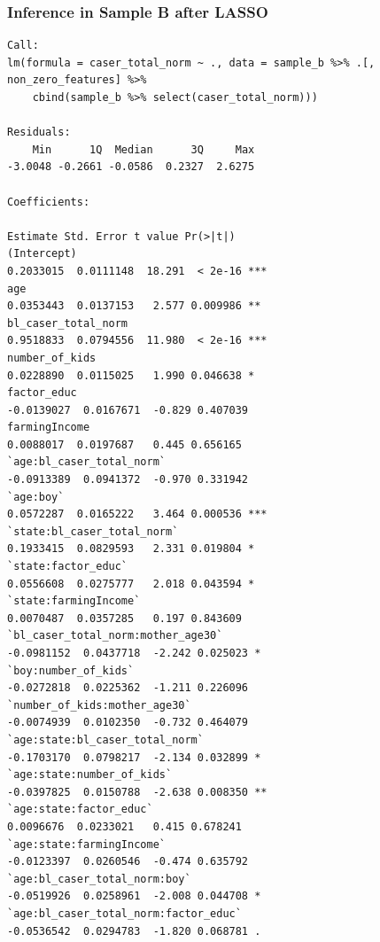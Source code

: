 \documentclass{article}
\begin{document}
\begin{figure}[H]
\subsubsection*{Inference in Sample B after LASSO}
  \begin{lstlisting}[style=RstyleCommentSmall, caption=CATE with Controls selected by LASSO]
Call:
lm(formula = caser_total_norm ~ ., data = sample_b %>% .[, non_zero_features] %>% 
    cbind(sample_b %>% select(caser_total_norm)))

Residuals:
    Min      1Q  Median      3Q     Max 
-3.0048 -0.2661 -0.0586  0.2327  2.6275 

Coefficients:
                                                    Estimate Std. Error t value Pr(>|t|)    
(Intercept)                                        0.2033015  0.0111148  18.291  < 2e-16 ***
age                                                0.0353443  0.0137153   2.577 0.009986 ** 
bl_caser_total_norm                                0.9518833  0.0794556  11.980  < 2e-16 ***
number_of_kids                                     0.0228890  0.0115025   1.990 0.046638 *  
factor_educ                                       -0.0139027  0.0167671  -0.829 0.407039    
farmingIncome                                      0.0088017  0.0197687   0.445 0.656165    
`age:bl_caser_total_norm`                         -0.0913389  0.0941372  -0.970 0.331942    
`age:boy`                                          0.0572287  0.0165222   3.464 0.000536 ***
`state:bl_caser_total_norm`                        0.1933415  0.0829593   2.331 0.019804 *  
`state:factor_educ`                                0.0556608  0.0275777   2.018 0.043594 *  
`state:farmingIncome`                              0.0070487  0.0357285   0.197 0.843609    
`bl_caser_total_norm:mother_age30`                -0.0981152  0.0437718  -2.242 0.025023 *  
`boy:number_of_kids`                              -0.0272818  0.0225362  -1.211 0.226096    
`number_of_kids:mother_age30`                     -0.0074939  0.0102350  -0.732 0.464079    
`age:state:bl_caser_total_norm`                   -0.1703170  0.0798217  -2.134 0.032899 *  
`age:state:number_of_kids`                        -0.0397825  0.0150788  -2.638 0.008350 ** 
`age:state:factor_educ`                            0.0096676  0.0233021   0.415 0.678241    
`age:state:farmingIncome`                         -0.0123397  0.0260546  -0.474 0.635792    
`age:bl_caser_total_norm:boy`                     -0.0519926  0.0258961  -2.008 0.044708 *  
`age:bl_caser_total_norm:factor_educ`             -0.0536542  0.0294783  -1.820 0.068781 .  

\end{lstlisting}
\end{figure}
\end{document}
